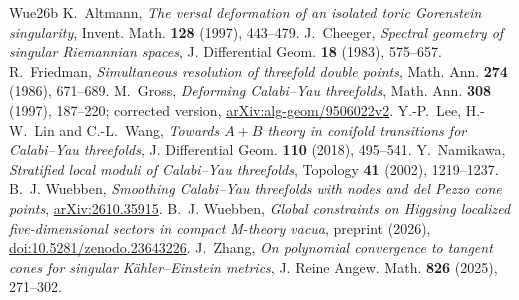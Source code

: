\documentclass[11pt]{amsart}
\theoremstyle{definition}\newtheorem{example}[theorem]{Example}
\theoremstyle{remark}\newtheorem{remark}[theorem]{Remark}
\begin{document}



\begin{thebibliography}{Wue26b}
 K.~Altmann, \emph{The versal deformation of an isolated toric
Gorenstein singularity}, Invent. Math. \textbf{128} (1997), 443--479.
 J.~Cheeger, \emph{Spectral geometry of singular Riemannian spaces},
J. Differential Geom. \textbf{18} (1983), 575--657.
 R.~Friedman, \emph{Simultaneous resolution of threefold double points},
Math. Ann. \textbf{274} (1986), 671--689.
 M.~Gross, \emph{Deforming Calabi--Yau threefolds}, Math. Ann.
\textbf{308} (1997), 187--220; corrected version,
\href{https://arxiv.org/abs/alg-geom/9506022v2}{arXiv:alg-geom/9506022v2}.
 Y.-P.~Lee, H.-W.~Lin and C.-L.~Wang, \emph{Towards $A+B$ theory in
conifold transitions for Calabi--Yau threefolds}, J. Differential Geom. \textbf{110}
(2018), 495--541.
 Y.~Namikawa, \emph{Stratified local moduli of Calabi--Yau threefolds},
Topology \textbf{41} (2002), 1219--1237.
 B.~J. Wuebben, \emph{Smoothing Calabi--Yau threefolds with nodes
and del Pezzo cone points}, \href{https://arxiv.org/abs/2610.35915}{arXiv:2610.35915}.
 B.~J. Wuebben, \emph{Global constraints on Higgsing localized
five-dimensional sectors in compact M-theory vacua}, preprint (2026),
\href{https://doi.org/10.5281/zenodo.23643226}{doi:10.5281/zenodo.23643226}.
 J.~Zhang, \emph{On polynomial convergence to tangent cones for
singular K\"ahler--Einstein metrics}, J. Reine Angew. Math. \textbf{826} (2025), 271--302.
\end{thebibliography}
\end{document}
